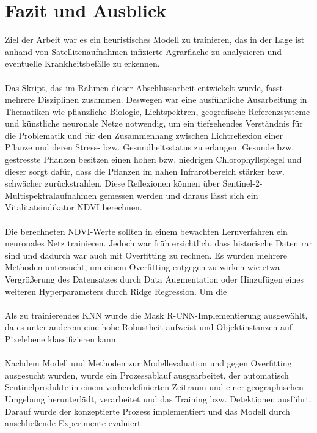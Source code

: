\chapter{Fazit und Ausblick}\label{chap:summary}

Ziel der Arbeit war es ein heuristisches Modell zu trainieren, das in der Lage ist anhand von Satellitenaufnahmen infizierte Agrarfläche zu analysieren und eventuelle Krankheitsbefälle zu erkennen. 
\\\\
Das Skript, das im Rahmen dieser Abschlussarbeit entwickelt wurde, fasst mehrere Disziplinen zusammen. Deswegen war eine ausführliche Ausarbeitung in Thematiken wie pflanzliche Biologie, Lichtspektren, geografische Referenzsysteme und künstliche neuronale Netze notwendig, um ein tiefgehendes Verständnis für die Problematik und für den Zusammenhang zwischen Lichtreflexion einer Pflanze und deren Stress- bzw. Gesundheitsstatus zu erlangen. Gesunde bzw. gestresste Pflanzen besitzen einen hohen bzw. niedrigen Chlorophyllspiegel und dieser sorgt dafür, dass die Pflanzen im nahen Infrarotbereich stärker bzw. schwächer zurückstrahlen. Diese Reflexionen können über Sentinel-2-Multispektralaufnahmen gemessen werden und daraus lässt sich ein Vitalitätsindikator NDVI berechnen.
\\\\
Die berechneten NDVI-Werte sollten in einem bewachten Lernverfahren ein neuronales Netz trainieren. Jedoch war früh ersichtlich, dass historische Daten rar sind und dadurch war auch mit Overfitting zu rechnen. Es wurden mehrere Methoden untersucht, um einem Overfitting entgegen zu wirken wie etwa Vergrößerung des Datensatzes durch Data Augmentation oder Hinzufügen eines weiteren Hyperparameters durch Ridge Regression. Um die 
\\\\
Als zu trainierendes KNN wurde die Mask R-CNN-Implementierung ausgewählt, da es unter anderem eine hohe Robustheit aufweist und Objektinstanzen auf Pixelebene klassifizieren kann. 
\\\\
Nachdem Modell und Methoden zur Modellevaluation und gegen Overfitting ausgesucht wurden, wurde ein Prozessablauf ausgearbeitet, der automatisch Sentinelprodukte in einem vorherdefinierten Zeitraum und einer geographischen Umgebung herunterlädt, verarbeitet und das Training bzw. Detektionen ausführt. Darauf wurde der konzeptierte Prozess implementiert und das Modell durch anschließende Experimente evaluiert.
\\\\
